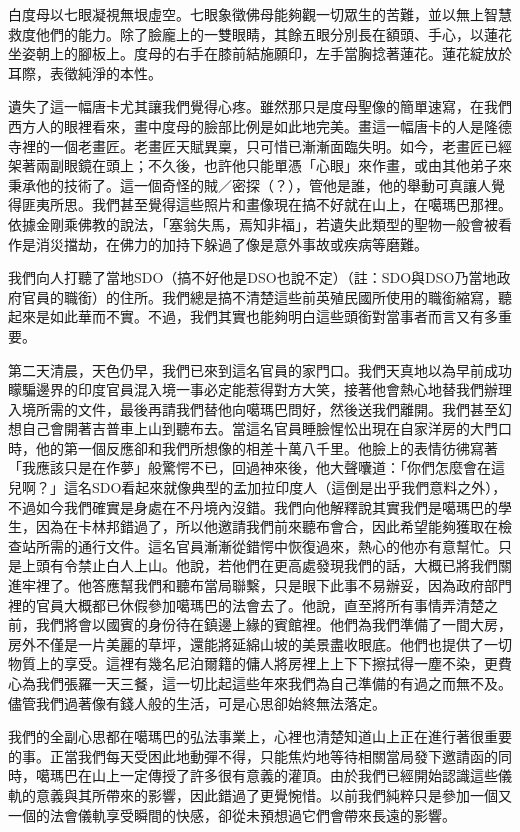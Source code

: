 白度母以七眼凝視無垠虛空。七眼象徵佛母能夠觀一切眾生的苦難，並以無上智慧救度他們的能力。除了臉龐上的一雙眼睛，其餘五眼分別長在額頭、手心，以蓮花坐姿朝上的腳板上。度母的右手在膝前結施願印，左手當胸捻著蓮花。蓮花綻放於耳際，表徵純淨的本性。

遺失了這一幅唐卡尤其讓我們覺得心疼。雖然那只是度母聖像的簡單速寫，在我們西方人的眼裡看來，畫中度母的臉部比例是如此地完美。畫這一幅唐卡的人是隆德寺裡的一個老畫匠。老畫匠天賦異稟，只可惜已漸漸面臨失明。如今，老畫匠已經架著兩副眼鏡在頭上；不久後，也許他只能單憑「心眼」來作畫，或由其他弟子來秉承他的技術了。這一個奇怪的賊／密探（？），管他是誰，他的舉動可真讓人覺得匪夷所思。我們甚至覺得這些照片和畫像現在搞不好就在山上，在噶瑪巴那裡。依據金剛乘佛教的說法，「塞翁失馬，焉知非福」，若遺失此類型的聖物一般會被看作是消災擋劫，在佛力的加持下躲過了像是意外事故或疾病等磨難。

我們向人打聽了當地SDO（搞不好他是DSO也說不定）（註：SDO與DSO乃當地政府官員的職銜）的住所。我們總是搞不清楚這些前英殖民國所使用的職銜縮寫，聽起來是如此華而不實。不過，我們其實也能夠明白這些頭銜對當事者而言又有多重要。

第二天清晨，天色仍早，我們已來到這名官員的家門口。我們天真地以為早前成功矇騙邊界的印度官員混入境一事必定能惹得對方大笑，接著他會熱心地替我們辦理入境所需的文件，最後再請我們替他向噶瑪巴問好，然後送我們離開。我們甚至幻想自己會開著吉普車上山到聽布去。當這名官員睡臉惺忪出現在自家洋房的大門口時，他的第一個反應卻和我們所想像的相差十萬八千里。他臉上的表情彷彿寫著「我應該只是在作夢」般驚愕不已，回過神來後，他大聲囔道：「你們怎麼會在這兒啊？」這名SDO看起來就像典型的孟加拉印度人（這倒是出乎我們意料之外），不過如今我們確實是身處在不丹境內沒錯。我們向他解釋說其實我們是噶瑪巴的學生，因為在卡林邦錯過了，所以他邀請我們前來聽布會合，因此希望能夠獲取在檢查站所需的通行文件。這名官員漸漸從錯愕中恢復過來，熱心的他亦有意幫忙。只是上頭有令禁止白人上山。他說，若他們在更高處發現我們的話，大概已將我們關進牢裡了。他答應幫我們和聽布當局聯繫，只是眼下此事不易辦妥，因為政府部門裡的官員大概都已休假參加噶瑪巴的法會去了。他說，直至將所有事情弄清楚之前，我們將會以國賓的身份待在鎮邊上緣的賓館裡。他們為我們準備了一間大房，房外不僅是一片美麗的草坪，還能將延綿山坡的美景盡收眼底。他們也提供了一切物質上的享受。這裡有幾名尼泊爾籍的傭人將房裡上上下下擦拭得一塵不染，更費心為我們張羅一天三餐，這一切比起這些年來我們為自己準備的有過之而無不及。儘管我們過著像有錢人般的生活，可是心思卻始終無法落定。

我們的全副心思都在噶瑪巴的弘法事業上，心裡也清楚知道山上正在進行著很重要的事。正當我們每天受困此地動彈不得，只能焦灼地等待相關當局發下邀請函的同時，噶瑪巴在山上一定傳授了許多很有意義的灌頂。由於我們已經開始認識這些儀軌的意義與其所帶來的影響，因此錯過了更覺惋惜。以前我們純粹只是參加一個又一個的法會儀軌享受瞬間的快感，卻從未預想過它們會帶來長遠的影響。

